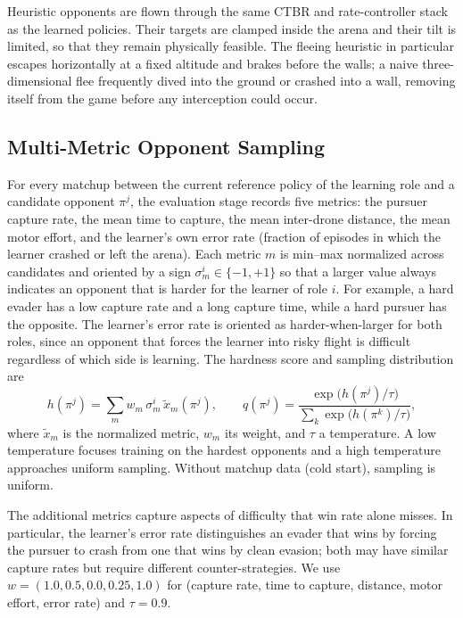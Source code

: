 Heuristic opponents are flown through the same CTBR and rate-controller stack as the learned policies. Their targets are clamped inside the arena and their tilt is limited, so that they remain physically feasible. The fleeing heuristic in particular escapes horizontally at a fixed altitude and brakes before the walls; a naive three-dimensional flee frequently dived into the ground or crashed into a wall, removing itself from the game before any interception could occur.

\subsection{Multi-Metric Opponent Sampling}
\noindent
For every matchup between the current reference policy of the learning role and a candidate opponent $\pi^j$, the evaluation stage records five metrics: the pursuer capture rate, the mean time to capture, the mean inter-drone distance, the mean motor effort, and the learner's own error rate (fraction of episodes in which the learner crashed or left the arena). Each metric $m$ is min--max normalized across candidates and oriented by a sign $\sigma_m^i \in \{-1, +1\}$ so that a larger value always indicates an opponent that is harder for the learner of role $i$. For example, a hard evader has a low capture rate and a long capture time, while a hard pursuer has the opposite. The learner's error rate is oriented as harder-when-larger for both roles, since an opponent that forces the learner into risky flight is difficult regardless of which side is learning. The hardness score and sampling distribution are
\begin{equation}
    h(\pi^j) = \sum_{m} w_m\, \sigma^i_m\, \tilde{x}_m(\pi^j), \qquad
    q(\pi^j) = \frac{\exp\!\big(h(\pi^j)/\tau\big)}{\sum_{k} \exp\!\big(h(\pi^k)/\tau\big)},
    \label{eq:sampling}
\end{equation}
where $\tilde{x}_m$ is the normalized metric, $w_m$ its weight, and $\tau$ a temperature. A low temperature focuses training on the hardest opponents and a high temperature approaches uniform sampling. Without matchup data (cold start), sampling is uniform.

The additional metrics capture aspects of difficulty that win rate alone misses. In particular, the learner's error rate distinguishes an evader that wins by forcing the pursuer to crash from one that wins by clean evasion; both may have similar capture rates but require different counter-strategies. We use $w = (1.0, 0.5, 0.0, 0.25, 1.0)$ for (capture rate, time to capture, distance, motor effort, error rate) and $\tau = 0.9$.

